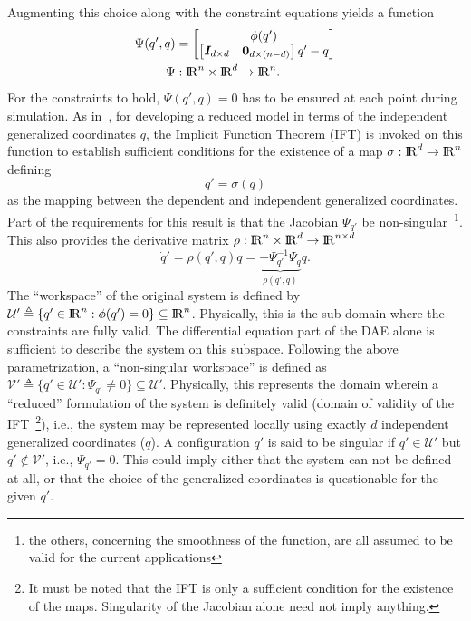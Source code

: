 \documentclass[10pt,final,journal,letterpaper,oneside,twocolumn]{IEEEtran}
\newcommand{\Real}{{\rm I\!R}}
\begin{document}
Augmenting this choice along with the constraint equations yields a
function
\begin{align}
  \Psi(q', q) &= \begin{bmatrix} \phi(q')\\ \begin{bmatrix} \bm{I}_{d\times d}
      & \bm{0}_{d\times
        (n-d)} \end{bmatrix}q' - q\end{bmatrix}\nonumber\\
  \Psi&: \Real^n \times \Real^d \to \Real^n.
  \label{eq:Psi} 
\end{align}
For the constraints to hold, $\Psi(q', q) = 0$ has to be ensured at
each point during simulation. As in~\cite{ghorbel_modeling_2000}, for
developing a reduced model in terms of the independent generalized
coordinates $q$, the Implicit Function Theorem (IFT) is invoked on
this function to establish sufficient conditions for the existence of
a map $\sigma: \Real^d \to \Real^n$ defining
\begin{equation}
  q' = \sigma(q)
  \label{eq:map}
\end{equation}
as the mapping between the dependent and independent generalized
coordinates. Part of the requirements for this result is that the
Jacobian $\Psi_{q'}$ be non-singular~\footnote{the others, concerning
  the smoothness of the function, are all assumed to be valid for the
  current applications}. This also provides the derivative matrix $\rho:
\Real^n \times \Real^d  \to \Real^{n\times d}$ 
\begin{equation}
  \dot{q}' = \rho(q', q) q =
  \underbrace{-\Psi_{q'}^{-1}\Psi_q}_{\rho(q', q)} q.
  \label{eq:dermap}
\end{equation}
The ``workspace'' of the original system is defined by $\mathcal{U}'
\triangleq \{q'\in \Real^n: \phi(q') = 0\} \subseteq
\Real^n$. Physically, this is the sub-domain where the constraints are
fully valid. The differential equation part of the DAE alone is
sufficient to describe the system on this subspace. Following the
above parametrization, a ``non-singular workspace'' is defined as
$\mathcal{V}' \triangleq \{q'\in \mathcal{U}': \Psi_{q'} \neq 0\}
\subseteq \mathcal{U}'$. Physically, this represents the domain
wherein a ``reduced'' formulation of the system is definitely valid
(domain of validity of the IFT~\footnote{It must be noted that the IFT is only a sufficient
  condition for the existence of the maps. Singularity of the Jacobian
  alone need not imply anything.}), i.e., the system may be
represented locally using exactly $d$ independent generalized
coordinates ($q$). A configuration $q'$ is said to be singular if
$q'\in \mathcal{U}'$ but $q' \notin \mathcal{V}'$, i.e., $\Psi_{q'} =
0$. This could imply either that the system can not be defined at all,
or that the choice of the generalized coordinates is questionable for
the given $q'$.
\end{document}
